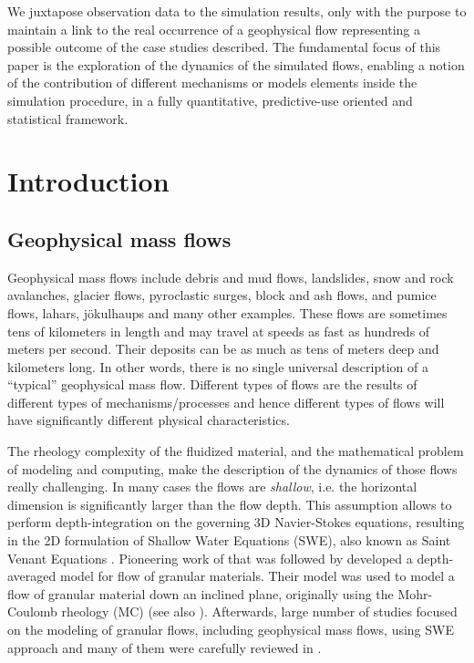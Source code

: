 \documentclass{article}
\begin{document}
We juxtapose observation data to the simulation results, only with the purpose to maintain a link to the real occurrence of a geophysical flow representing a possible outcome of the case studies described. The fundamental focus of this paper is the exploration of the dynamics of the simulated flows, enabling a notion of the contribution of different mechanisms or models elements inside the simulation procedure, in a fully quantitative, predictive-use oriented and statistical framework.

\newpage
\section{Introduction}\label{sec:Intro}

\subsection{Geophysical mass flows}\label{subsec:FlowTypes}
Geophysical mass flows include debris and mud flows, landslides, snow and rock avalanches, glacier flows, pyroclastic surges, block and ash flows, and pumice flows, lahars, j\"okulhaups and many other examples. These flows are sometimes tens of kilometers in length and may travel at speeds as fast as hundreds of meters per second. Their deposits can be as much as tens of meters deep and kilometers long. In other words, there is no single universal description of a ``typical'' geophysical mass flow. Different types of flows are the results of different types of mechanisms/processes and hence different types of flows will have significantly different physical characteristics.

The rheology complexity of the fluidized material, and the mathematical problem of modeling and computing, make the description of the dynamics of those flows really challenging. In many cases the flows are \emph{shallow}, i.e. the horizontal dimension is significantly larger than the flow depth. This assumption allows to perform depth-integration on the governing 3D Navier-Stokes equations, resulting in the 2D formulation of Shallow Water Equations (SWE), also known as Saint Venant Equations \citep{Batchelor2000, Luca2016}. Pioneering work of \cite{SavageHutter1989} that was followed by \cite{Hutter1993,DadeHuppert1998} developed a depth-averaged model for flow of granular materials. Their model was used to model a flow of granular material down an inclined plane, originally using the Mohr-Coulomb rheology (MC) (see also \cite{Jaeger1989,FraccarolloToro1995}). Afterwards, large number of studies focused on the modeling of granular flows, including geophysical mass flows, using SWE approach and many of them were carefully reviewed in \cite{PudasainiHutter2007}.
\end{document}
